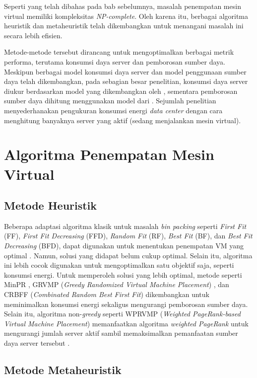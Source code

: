 Seperti yang telah dibahas pada bab sebelumnya, masalah penempatan mesin virtual memiliki kompleksitas \textit{NP-complete}. Oleh karena itu, berbagai algoritma heuristik dan metaheuristik telah dikembangkan untuk menangani masalah ini secara lebih efisien.

  Metode-metode tersebut dirancang untuk mengoptimalkan berbagai metrik performa, terutama konsumsi daya server dan pemborosan sumber daya. Meskipun berbagai model konsumsi daya server \citep{AhmedBollenAlvarez2021} dan model penggunaan sumber daya telah dikembangkan, pada sebagian besar penelitian, konsumsi daya server diukur berdasarkan model yang dikembangkan oleh \citet{BeloglazlovAbawajyBuyya2012}, sementara pemborosan sumber daya dihitung menggunakan model dari \citet{Gao2013}. Sejumlah penelitian menyederhanakan pengukuran konsumsi energi \textit{data center} dengan cara menghitung banyaknya server yang aktif (sedang menjalankan mesin virtual).  

\section{Algoritma Penempatan Mesin Virtual}
\subsection{Metode Heuristik}
Beberapa adaptasi algoritma klasik untuk masalah \textit{bin packing} seperti \textit{First Fit} (FF), \textit{First Fit Decreasing} (FFD), \textit{Random Fit} (RF), \textit{Best Fit} (BF), dan \textit{Best Fit Decreasing} (BFD), dapat digunakan untuk menentukan penempatan VM yang optimal \citep{AlharabeRakroukiAljohani2022}. Namun, solusi yang didapat belum cukup optimal. Selain itu, algoritma ini lebih cocok digunakan untuk mengoptimalkan satu objektif saja, seperti konsumsi energi. Untuk memperoleh solusi yang lebih optimal, metode seperti MinPR \citep{AziziZandsalimiLi2020}, GRVMP (\textit{Greedy Randomized Virtual Machine Placement}) \citep{Azizi2021}, dan CRBFF (\textit{Combinated Random Best First Fit}) \citep{YousefiBabamir2024} dikembangkan untuk meminimalkan konsumsi energi sekaligus mengurangi pemborosan sumber daya. Selain itu, algoritma non-\textit{greedy} seperti WPRVMP (\textit{Weighted PageRank-based Virtual Machine Placement}) memanfaatkan algoritma \textit{weighted PageRank} untuk mengurangi jumlah server aktif sambil memaksimalkan pemanfaatan sumber daya server tersebut \citep{YaoShenWang2019}.

\subsection{Metode Metaheuristik}


